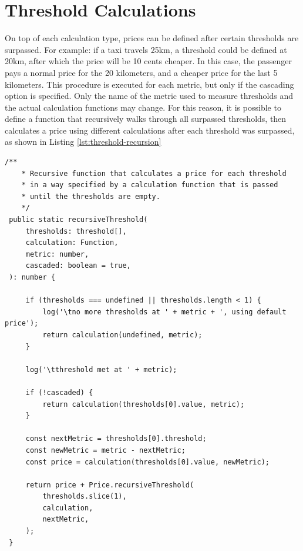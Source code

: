 \section{Threshold Calculations}
On top of each calculation type, prices can be defined after certain thresholds are surpassed. For example: if a taxi travels 25km, a threshold could be defined at 20km, after which the price will be 10 cents cheaper. In this case, the passenger pays a normal price for the 20 kilometers, and a cheaper price for the last 5 kilometers. This procedure is executed for each metric, but only if the cascading option is specified.  Only the name of the metric used to measure thresholds and the actual calculation functions may change. For this reason, it is possible to define a function that recursively walks through all surpassed thresholds, then calculates a price using different calculations after each threshold was surpassed, as shown in Listing \ref{lst:threshold-recursion}

\begin{center}
\noindent\begin{minipage}{.85\textwidth}
\begin{lstlisting}[caption={Recursive threshold calculation.}, label={lst:threshold-recursion}]
	/**
	* Recursive function that calculates a price for each threshold
	* in a way specified by a calculation function that is passed
	* until the thresholds are empty.
	*/
 public static recursiveThreshold(
	 thresholds: threshold[],
	 calculation: Function,
	 metric: number,
	 cascaded: boolean = true,
 ): number {

	 if (thresholds === undefined || thresholds.length < 1) {
		 log('\tno more thresholds at ' + metric + ', using default price');
		 return calculation(undefined, metric);
	 }

	 log('\tthreshold met at ' + metric);

	 if (!cascaded) {
		 return calculation(thresholds[0].value, metric);
	 }

	 const nextMetric = thresholds[0].threshold;
	 const newMetric = metric - nextMetric;
	 const price = calculation(thresholds[0].value, newMetric);

	 return price + Price.recursiveThreshold(
		 thresholds.slice(1),
		 calculation,
		 nextMetric,
	 );
 }
\end{lstlisting}
\end{minipage}
\end{center}

